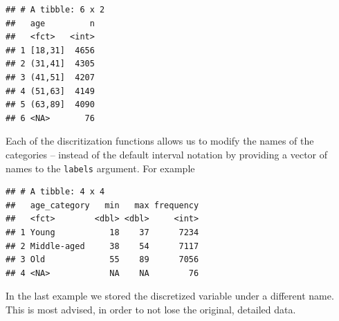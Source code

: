 \documentclass[]{tufte-book}
\newenvironment{Shaded}{}{}
\newcommand{\DataTypeTok}[1]{\textcolor[rgb]{0.56,0.13,0.00}{#1}}
\newcommand{\DecValTok}[1]{\textcolor[rgb]{0.25,0.63,0.44}{#1}}
\newcommand{\KeywordTok}[1]{\textcolor[rgb]{0.00,0.44,0.13}{\textbf{#1}}}
\newcommand{\NormalTok}[1]{#1}
\newcommand{\OperatorTok}[1]{\textcolor[rgb]{0.40,0.40,0.40}{#1}}
\newcommand{\StringTok}[1]{\textcolor[rgb]{0.25,0.44,0.63}{#1}}
\begin{document}
\begin{Shaded}
\end{Shaded}

\begin{verbatim}
## # A tibble: 6 x 2
##   age         n
##   <fct>   <int>
## 1 [18,31]  4656
## 2 (31,41]  4305
## 3 (41,51]  4207
## 4 (51,63]  4149
## 5 (63,89]  4090
## 6 <NA>       76
\end{verbatim}

Each of the discritization functions allows us to modify the names of the categories -- instead of the default interval notation by providing a vector of names to the \texttt{labels} argument. For example

\begin{Shaded}
\end{Shaded}

\begin{verbatim}
## # A tibble: 4 x 4
##   age_category   min   max frequency
##   <fct>        <dbl> <dbl>     <int>
## 1 Young           18    37      7234
## 2 Middle-aged     38    54      7117
## 3 Old             55    89      7056
## 4 <NA>            NA    NA        76
\end{verbatim}

In the last example we stored the discretized variable under a different name. This is most advised, in order to not lose the original, detailed data.
\end{document}
